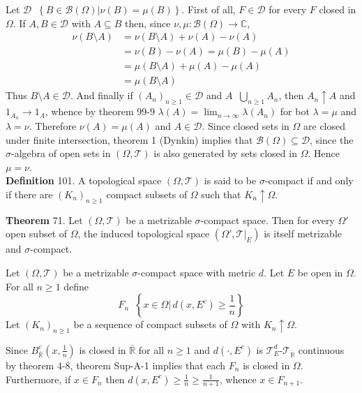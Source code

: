 \documentclass[a4paper]{article}
\newcommand{\obj}[1]{\left\{ #1 \right \}}
\newcommand{\brac}[1]{\left ( #1 \right )}
\newcommand{\induc}[1]{\left . #1 \right \vert}
\newcommand{\Rbar}{{\bar{\mathbb{R}}}}
\newcommand{\Cplx}{\mathbb{C}}
\newcommand{\Tcal}{\mathcal{T}}
\newcommand{\Dcal}{\mathcal{D}}
\newcommand{\borel}[1]{\mathcal{B}\brac{#1}}
\newcommand{\defn}{\mathop{\overset{\Delta}{=}}\nolimits}
\begin{document}
Let $\Dcal\defn \obj{\induc{B\in\borel{\Omega}} \nu\brac{B}=\mu\brac{B}}$. First of all, $F\in \Dcal$ for every $F$ closed in $\Omega$. If $A,B\in \Dcal$ with $A\subseteq B$ then, since $\nu,\mu:\borel{\Omega}\to\Cplx$, \begin{align*}\nu\brac{B\setminus A}&=\nu\brac{B\setminus A} + \nu\brac{A} - \nu\brac{A}\\ &= \nu\brac{B}-\nu\brac{A} = \mu\brac{B}-\mu\brac{A}\\&= \mu\brac{B\setminus A}+\mu\brac{A}-\mu\brac{A}\\&= \mu\brac{B\setminus A}\end{align*} Thus $B\setminus A\in \Dcal$. And finally if $\brac{A_n}_{n\geq1}\in \Dcal$ and $A\defn \bigcup_{n\geq1} A_n$, then $A_n\uparrow A$ and $1_{A_n}\to 1_A$, whence by theorem 99-9 $\lambda\brac{A} = \lim_{n\to\infty} \lambda\brac{A_n}$ for bot $\lambda=\mu$ and $\lambda=\nu$. Therefore $\nu\brac{A}=\mu\brac{A}$ and $A\in \Dcal$. Since closed sets in $\Omega$ are closed under finite intersection, theorem 1 (Dynkin) implies that $\borel{\Omega}\subseteq \Dcal$, since the $\sigma$-algebra of open sets in $\brac{\Omega, \Tcal}$ is also generated by sets closed in $\Omega$. Hence $\mu=\nu$.\\

\noindent \textbf{Definition} 101.
A topological space $\brac{\Omega,\Tcal}$ is said to be $\sigma$-compact if and only if there are $\brac{K_n}_{n\geq1}$ compact subsets of $\Omega$ such that $K_n\uparrow \Omega$.

\label{thm:sigma_compact_subspace} \noindent \textbf{Theorem} 71.
Let $\brac{\Omega, \Tcal}$ be a metrizable $\sigma$-compact space. Then for every $\Omega'$ open subset of $\Omega$, the induced topological space $\brac{\Omega', \induc{\Tcal}_E}$ is itself metrizable and $\sigma$-compact.

Let $\brac{\Omega, \Tcal}$ be a metrizable $\sigma$-compact space with metric $d$. Let $E$ be open in $\Omega$. For all $n\geq1$ define \[F_n\defn \obj{ \induc{x\in \Omega}\, d\brac{x,E^c}\geq \frac{1}{n} }\] Let $\brac{K_n}_{n\geq1}$ be a sequence of compact subsets of $\Omega$ with $K_n\uparrow \Omega$.

Since $B_\Rbar^c\brac{x,\frac{1}{n}}$ is closed in $\Rbar$ for all $n\geq1$ and $d\brac{\cdot,E^c}$ is $\Tcal_E^d$-$\Tcal_\Rbar$ continuous by theorem 4-8, theorem Sup-A-1 implies that each $F_n$ is closed in $\Omega$. Furthermore, if $x\in F_n$ then $d\brac{x,E^c}\geq \frac{1}{n}\geq\frac{1}{n+1}$, whence $x\in F_{n+1}$.
\end{document}
